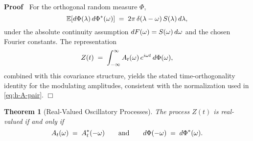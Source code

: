 \documentclass{article}
\newenvironment{proof}{\noindent\textbf{Proof\ }}{\hspace*{\fill}$\Box$\medskip}
\newtheorem{theorem}{Theorem}
\begin{document}
\begin{proof}
  For the orthogonal random measure $\Phi$,
  \[ \mathbb{E} \hspace{-0.17em} \left[ d \Phi (\lambda) \hspace{0.17em} d
     \Phi^{\ast} (\omega) \right] \hspace{0.27em} = \hspace{0.27em} 2 \pi
     \hspace{0.17em} \delta (\lambda - \omega)  \hspace{0.17em} S (\lambda) 
     \hspace{0.17em} d \lambda, \]
  under the absolute continuity assumption $dF (\omega) = S (\omega) 
  \hspace{0.17em} d \omega$ and the chosen Fourier constants. The
  representation
  \[ Z (t) \hspace{0.27em} = \hspace{0.27em} \int_{- \infty}^{\infty} A_t
     (\omega)  \hspace{0.17em} e^{i \omega t}  \hspace{0.17em} d \Phi
     (\omega), \]
  combined with this covariance structure, yields the stated
  time-orthogonality identity for the modulating amplitudes, consistent with
  the normalization used in \eqref{eq:h-A-pair}.
\end{proof}

\begin{theorem}[Real-Valued Oscillatory Processes]
  The process $Z (t)$ is real-valued if and only if
  \begin{equation}
    A_t (\omega) \hspace{0.27em} = \hspace{0.27em} A_t^{\ast}  (- \omega) 
    \qquad \text{and} \qquad d \Phi (- \omega) \hspace{0.27em} =
    \hspace{0.27em} d \Phi^{\ast} (\omega) .
  \end{equation}
\end{theorem}
\end{document}
